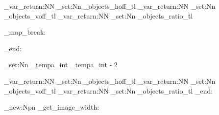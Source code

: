 {{{{{{            \group_var_return:NN \tl_set:Nn \subfig_objects_hoff_tl
            \group_var_return:NN \tl_set:Nn \subfig_objects_voff_tl
            \group_var_return:NN \tl_set:Nn \subfig_objects_ratio_tl

            \tl_map_break:
          }
        }
        \group_end:
      }
    }
    
    \int_set:Nn \subfig_tempa_int { \subfig_tempa_int - 2 }
  }
  
  \group_var_return:NN \tl_set:Nn \subfig_objects_hoff_tl
  \group_var_return:NN \tl_set:Nn \subfig_objects_voff_tl
  \group_var_return:NN \tl_set:Nn \subfig_objects_ratio_tl
  \group_end:
}

\cs_new:Npn \subfig_get_image_width:
